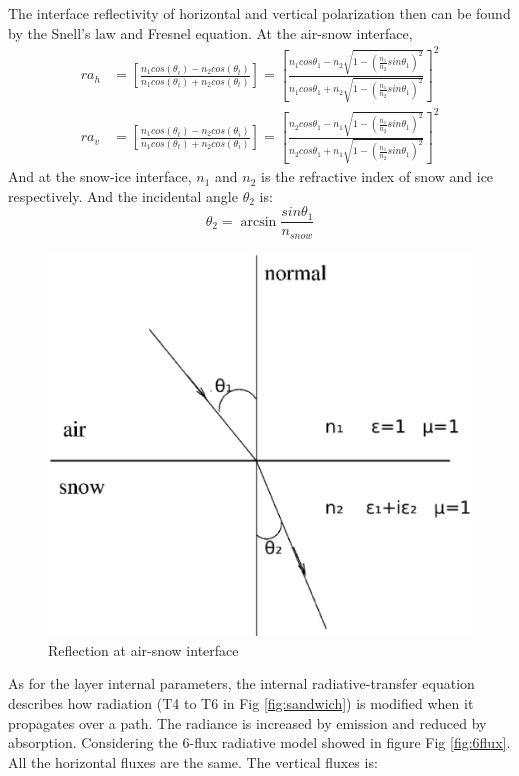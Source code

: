 The interface reflectivity of horizontal and vertical polarization  then can be found by the Snell's law and Fresnel equation. At the air-snow interface,
\begin{equation*}
\begin{split}
  ra_h &= \left[\frac{n_1cos(\theta_i)-n_2cos(\theta_t)}{n_1cos(\theta_i)+n_2cos(\theta_t)}\right]
       = \left[\frac{n_1cos\theta_1-n_2\sqrt{1-(\frac{n_1}{n_2}sin\theta_1)^2}}{n_1cos\theta_1+n_2\sqrt{1-(\frac{n_1}{n_2}sin\theta_1)^2}}\right]^2\\
  ra_v &= \left[\frac{n_1cos(\theta_t)-n_2cos(\theta_i)}{n_1cos(\theta_t)+n_2cos(\theta_i)}\right]
       = \left[\frac{n_2cos\theta_1-n_1\sqrt{1-(\frac{n_1}{n_2}sin\theta_1)^2}}{n_2cos\theta_1+n_1\sqrt{1-(\frac{n_1}{n_2}sin\theta_1)^2}}\right]^2
\end{split}
\end{equation*}
And at the snow-ice interface, $n_1$ and $n_2$ is the refractive index of snow and ice respectively. And the incidental angle $\theta_2$ is:
\begin{equation*}
 \theta_2=\arcsin{\frac{sin\theta_1}{n_{snow}}}
\end{equation*}
\begin{figure}[hbp]
  \centering
   \includegraphics[scale=0.45]{snell.eps} 
  \caption{Reflection at air-snow interface}
  \label{fig:snell}
\end{figure}
As for the layer internal parameters, the internal radiative-transfer equation describes how radiation (T4 to T6 in Fig \ref{fig:sandwich}) is modified when it propagates over a path.  The  radiance is increased by emission and reduced by absorption. Considering the 6-flux radiative model showed in figure Fig \ref{fig:6flux}. All the horizontal fluxes are the same. The vertical fluxes is: \\
